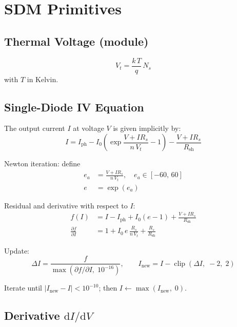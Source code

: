 \documentclass[11pt,a4paper]{article}
\begin{document}
\section{SDM Primitives}

\subsection{Thermal Voltage (module)}

\begin{equation}
  \boxed{
  V_t = \frac{k\,T}{q}\,N_s
  }
\end{equation}
with \(T\) in Kelvin.

\subsection{Single-Diode IV Equation}

The output current \(I\) at voltage \(V\) is given implicitly by:
\begin{equation}
  \boxed{
  I = I_{\mathrm{ph}} - I_0\left(\exp\frac{V + I R_s}{n\,V_t} - 1\right) - \frac{V + I R_s}{R_{\mathrm{sh}}}
  }
\end{equation}

Newton iteration: define
\begin{align}
  e_a &= \frac{V + I R_s}{n\,V_t}, \quad e_a \in [-60,\,60] \\
  e &= \exp(e_a)
\end{align}

Residual and derivative with respect to \(I\):
\begin{align}
  f(I) &= I - I_{\mathrm{ph}} + I_0(e - 1) + \frac{V + I R_s}{R_{\mathrm{sh}}} \\
  \frac{\partial f}{\partial I} &= 1 + I_0\,e\,\frac{R_s}{n\,V_t} + \frac{R_s}{R_{\mathrm{sh}}}
\end{align}

Update:
\begin{equation}
  \Delta I = \frac{f}{\max(\partial f/\partial I,\; 10^{-16})}, \qquad
  I_{\mathrm{new}} = I - \operatorname{clip}(\Delta I,\; -2,\; 2)
\end{equation}

Iterate until \(|I_{\mathrm{new}} - I| < 10^{-10}\); then \(I \leftarrow \max(I_{\mathrm{new}},\; 0)\).

\subsection{Derivative \(\mathrm{d}I/\mathrm{d}V\)}
\end{document}
